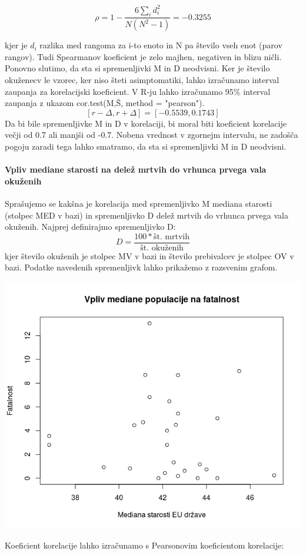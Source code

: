 \documentclass[a4paper,11pt]{article}
\begin{document}
\begin{center}
\[\rho = 1 - \frac{6\sum_{i}{}d_i^2}{N(N^2 - 1)} = -0.3255\]
\end{center} 

kjer je \( d_i \) razlika med rangoma za i-to enoto in N pa število vseh enot (parov rangov). Tudi Spearmanov koeficient je zelo majhen, negativen in blizu ničli. Ponovno slutimo, da sta si spremenljivki M in D neodvisni.
Ker je število okuženecv le vzorec, ker niso šteti asimptomatiki, lahko izračunamo interval zaupanja za korelacijski koeficient. V R-ju lahko izračunamo 95\% interval zaupanja z ukazom cor.test(M,Š, method = "pearson").
\[[r - \Delta, r + \Delta] = [-0.5539, 0.1743]\]
Da bi bile spremenljivke M in D v korelaciji, bi moral biti koeficient korelacije večji od 0.7 ali manjši od -0.7. Nobena vrednost v zgornejm intervalu, ne zadošča pogoju zaradi tega lahko smatramo, da sta si spremenljivki M in D neodvisni.

\paragraph{Vpliv mediane starosti na delež mrtvih do vrhunca prvega vala okuženih}
Sprašujemo se kakšna je korelacija med spremenljivko M mediana starosti (stolpec MED v bazi) in spremenljivko D delež mrtvih do vrhunca prvega vala okuženih. Najprej definirajmo spremenljivko D:
\[D = \frac{100 * \text{št. mrtvih}}{\text{št. okuženih}}\]
kjer število okuženih je stolpec MV v bazi in število prebivalcev je stolpec OV v bazi. Podatke navedenih spremenljivk lahko prikažemo z razsvenim grafom.
\\
\begin{center}
\includegraphics[scale=0.6]{vpliv_med_pop_na_fatalnost}\\
\end{center}
Koeficient korelacije lahko izračunamo s Pearsonovim koeficientom korelacije:
\end{document}
